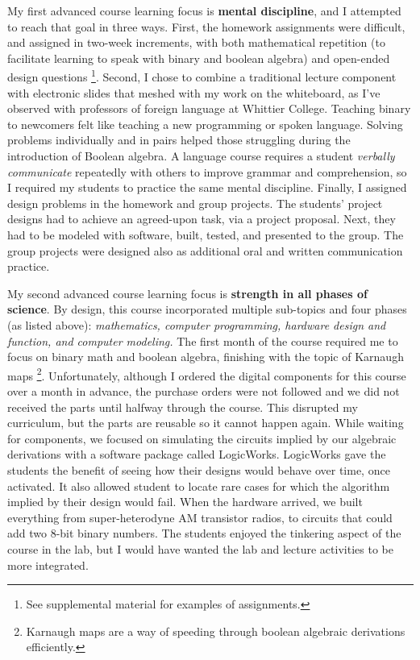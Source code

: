 \documentclass[../../../main.tex]{subfiles}
\begin{document}
My first advanced course learning focus is \textbf{mental discipline}, and I attempted to reach that goal in three ways.  First, the homework assignments were difficult, and assigned in two-week increments, with both mathematical repetition (to facilitate learning to speak with binary and boolean algebra) and open-ended design questions \footnote{See supplemental material for examples of assignments.}.  Second, I chose to combine a traditional lecture component with electronic slides that meshed with my work on the whiteboard, as I've observed with professors of foreign language at Whittier College.  Teaching binary to newcomers felt like teaching a new programming or spoken language.  Solving problems individually and in pairs helped those struggling during the introduction of Boolean algebra.  A language course requires a student \textit{verbally communicate} repeatedly with others to improve grammar and comprehension, so I required my students to practice the same mental discipline.  Finally, I assigned design problems in the homework and group projects.  The students' project designs had to achieve an agreed-upon task, via a project proposal.  Next, they had to be modeled with software, built, tested, and presented to the group.  The group projects were designed also as additional oral and written communication practice. \\ \hspace{0.1cm}

My second advanced course learning focus is \textbf{strength in all phases of science}.  By design, this course incorporated multiple sub-topics and four phases (as listed above): \textit{mathematics, computer programming, hardware design and function, and computer modeling.}  The first month of the course required me to focus on binary math and boolean algebra, finishing with the topic of Karnaugh maps \footnote{Karnaugh maps are a way of speeding through boolean algebraic derivations efficiently.}.  Unfortunately, although I ordered the digital components for this course over a month in advance, the purchase orders were not followed and we did not received the parts until halfway through the course.  This disrupted my curriculum, but the parts are reusable so it cannot happen again.  While waiting for components, we focused on simulating the circuits implied by our algebraic derivations with a software package called LogicWorks.  LogicWorks gave the students the benefit of seeing how their designs would behave over time, once activated.  It also allowed student to locate rare cases for which the algorithm implied by their design would fail.  When the hardware arrived, we built everything from super-heterodyne AM transistor radios, to circuits that could add two 8-bit binary numbers.  The students enjoyed the tinkering aspect of the course in the lab, but I would have wanted the lab and lecture activities to be more integrated. \\ \hspace{0.1cm}
\end{document}
